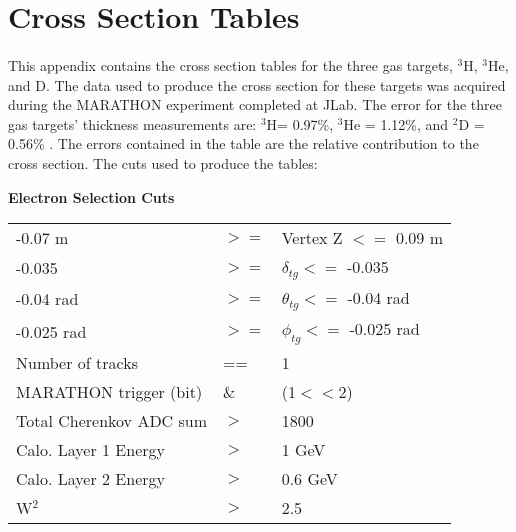

\section{Cross Section Tables}\label{CST}
\paragraph{}This appendix contains the cross section tables for the three gas targets, $^3$H, $^3$He, and D. The data used to produce the cross section for these targets was acquired during the MARATHON experiment completed at JLab. The error for the three gas targets' thickness measurements are: $^3$H= 0.97\%, $^3$He = 1.12\%, and $^2$D = 0.56\% \cite{HATT_eng}. The errors contained in the table are the relative contribution to the cross section. The cuts used to produce the tables:

\textbf{Electron Selection Cuts}\\
\begin{tabular}{@{$\bullet$ }lll}
	-0.07 m &$>=$& Vertex Z $<=$ 0.09 m\\
	-0.035 &$ >=$ &$\delta_{tg} <=$ -0.035\\
	-0.04 rad &$>=$  &$\theta_{tg} <=$ -0.04 rad\\
	-0.025 rad &$>=$  &$\phi_{tg}   <=$ -0.025 rad\\
	Number of tracks & ==& 1\\
	MARATHON trigger (bit)  &\& &(1$<<$2)\\
	Total Cherenkov ADC sum &$>$ &1800\\
	Calo. Layer 1 Energy &$>$ & 1 GeV\\
	Calo. Layer 2 Energy &$>$ & 0.6 GeV\\
		W$^2$ &$>$ &2.5
\end{tabular}

